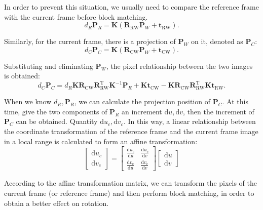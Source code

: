 In order to prevent this situation, we usually need to compare the reference frame with the current frame before block matching.
\begin{equation}
	d_R {\bm{P}_R} = \bm{K} \left( {{\bm{R}_{\mathrm{RW}}}{\bm{P}_W} + {\bm{t}_{\mathrm{RW}}}} \right).
\end{equation}

Similarly, for the current frame, there is a projection of $\bm{P}_W$ on it, denoted as $\bm{P}_C$:
\begin{equation}
	d_C {\bm{P}_C} = \bm{K} \left( {{\bm{R}_{\mathrm{CW}}}{\bm{P}_W} + {\bm{t}_{\mathrm{CW}}}} \right).
\end{equation}

Substituting and eliminating $\bm{P}_W$, the pixel relationship between the two images is obtained:
\begin{equation}
	d_C {\bm{P}_C} = d_R \bm{K} \bm{R}_{\mathrm{CW}} \bm{R}_{\mathrm{RW}}^\mathrm{T} \bm{K}^{-1} \bm{P}_R + \bm{K} \bm{t}_{\mathrm{CW}} - \bm{K} \bm{R}_{\mathrm{CW}} \bm{R}_{\mathrm{RW}}^\mathrm{T} \bm{K} \bm{t}_{\mathrm{RW}}.
\end{equation}

When we know $d_R, \bm{P}_R$, we can calculate the projection position of $\bm{P}_C$. At this time, give the two components of $\bm{P}_R$ an increment $\mathrm{d}u, \mathrm{d}v$, then the increment of $\bm{P}_C$ can be obtained. Quantity $\mathrm{d}u_c, \mathrm{d}v_c$. In this way, a linear relationship between the coordinate transformation of the reference frame and the current frame image in a local range is calculated to form an affine transformation:
\begin{equation}
	\left[ \begin{array}{l}
		\mathrm{d}u_c\\
		\mathrm{d}v_c
	\end{array} \right] = \left[ {\begin{array}{*{20}{c}}
			{\frac{{\mathrm{d}u_c}}{{\mathrm{d}u}}}&{\frac{{\mathrm{d}u_c}}{{\mathrm{d}v}}}\\
			{\frac{{\mathrm{d}v_c}}{{\mathrm{d}u}}}&{\frac{{\mathrm{d}v_c}}{{\mathrm{d}v}}}
	\end{array}} \right]\left[ \begin{array}{l}
		\mathrm{d}u\\
		\mathrm{d}v
	\end{array} \right]
\end{equation}

According to the affine transformation matrix, we can transform the pixels of the current frame (or reference frame) and then perform block matching, in order to obtain a better effect on rotation.

